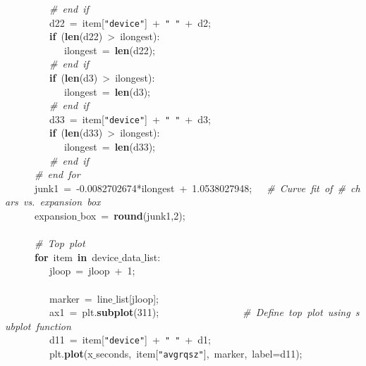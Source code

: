 \mbox{}\ \ \ \ \ \ \ \ \ \textit{\#\ end\ if} \\
\mbox{}\ \ \ \ \ \ \ \ \ d22\ =\ item[\texttt{"{}device"{}}]\ +\ \texttt{"{}\ "{}}\ +\ d2; \\
\mbox{}\ \ \ \ \ \ \ \ \ \textbf{if}\ (\textbf{len}(d22)\ \textgreater{}\ ilongest): \\
\mbox{}\ \ \ \ \ \ \ \ \ \ \ \ ilongest\ =\ \textbf{len}(d22); \\
\mbox{}\ \ \ \ \ \ \ \ \ \textit{\#\ end\ if} \\
\mbox{}\ \ \ \ \ \ \ \ \ \textbf{if}\ (\textbf{len}(d3)\ \textgreater{}\ ilongest): \\
\mbox{}\ \ \ \ \ \ \ \ \ \ \ \ ilongest\ =\ \textbf{len}(d3); \\
\mbox{}\ \ \ \ \ \ \ \ \ \textit{\#\ end\ if} \\
\mbox{}\ \ \ \ \ \ \ \ \ d33\ =\ item[\texttt{"{}device"{}}]\ +\ \texttt{"{}\ "{}}\ +\ d3; \\
\mbox{}\ \ \ \ \ \ \ \ \ \textbf{if}\ (\textbf{len}(d33)\ \textgreater{}\ ilongest): \\
\mbox{}\ \ \ \ \ \ \ \ \ \ \ \ ilongest\ =\ \textbf{len}(d33); \\
\mbox{}\ \ \ \ \ \ \ \ \ \textit{\#\ end\ if} \\
\mbox{}\ \ \ \ \ \ \textit{\#\ end\ for} \\
\mbox{}\ \ \ \ \ \ junk1\ =\ -0.0082702674*ilongest\ +\ 1.0538027948;\ \ \ \textit{\#\ Curve\ fit\ of\ \#\ chars\ vs.\ expansion\ box} \\
\mbox{}\ \ \ \ \ \ expansion$\_$box\ =\ \textbf{round}(junk1,2); \\
\mbox{}\ \ \ \ \ \  \\
\mbox{}\ \ \ \ \ \ \textit{\#\ Top\ plot} \\
\mbox{}\ \ \ \ \ \ \textbf{for}\ item\ \textbf{in}\ device$\_$data$\_$list: \\
\mbox{}\ \ \ \ \ \ \ \ \ jloop\ =\ jloop\ +\ 1; \\
\mbox{}\ \ \ \ \ \ \ \ \  \\
\mbox{}\ \ \ \ \ \ \ \ \ marker\ =\ line$\_$list[jloop]; \\
\mbox{}\ \ \ \ \ \ \ \ \ ax1\ =\ plt.\textbf{subplot}(311);\ \ \ \ \ \ \ \ \ \ \ \ \ \ \ \ \ \textit{\#\ Define\ top\ plot\ using\ subplot\ function} \\
\mbox{}\ \ \ \ \ \ \ \ \ d11\ =\ item[\texttt{"{}device"{}}]\ +\ \texttt{"{}\ "{}}\ +\ d1; \\
\mbox{}\ \ \ \ \ \ \ \ \ plt.\textbf{plot}(x$\_$seconds,\ item[\texttt{"{}avgrqsz"{}}],\ marker,\ label=d11); \\
